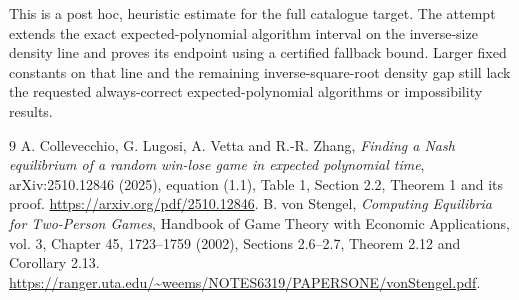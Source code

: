 \documentclass[11pt]{article}
\theoremstyle{remark}
\begin{document}
This is a post hoc, heuristic estimate for the full catalogue target.
The attempt extends the exact expected-polynomial algorithm interval on the inverse-size density line and proves its endpoint using a certified fallback bound. Larger fixed constants on that line and the remaining inverse-square-root density gap still lack the requested always-correct expected-polynomial algorithms or impossibility results.

\begin{thebibliography}{9}
 A. Collevecchio, G. Lugosi, A. Vetta and R.-R. Zhang, \emph{Finding a Nash equilibrium of a random win-lose game in expected polynomial time}, arXiv:2510.12846 (2025), equation (1.1), Table 1, Section 2.2, Theorem 1 and its proof. \url{https://arxiv.org/pdf/2510.12846}.
 B. von Stengel, \emph{Computing Equilibria for Two-Person Games}, Handbook of Game Theory with Economic Applications, vol. 3, Chapter 45, 1723--1759 (2002), Sections 2.6--2.7, Theorem 2.12 and Corollary 2.13. \url{https://ranger.uta.edu/~weems/NOTES6319/PAPERSONE/vonStengel.pdf}.
\end{thebibliography}
\end{document}
